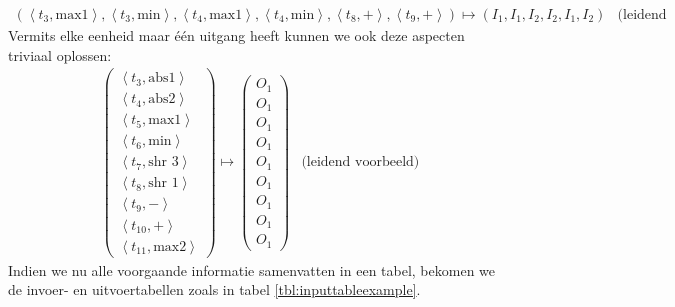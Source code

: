 \begin{equation}
\begin{array}{lr}
\left(\left\langle t_3,\mbox{max1}\right\rangle,\left\langle t_3,\mbox{min}\right\rangle,\left\langle t_4,\mbox{max1}\right\rangle,\left\langle t_4,\mbox{min}\right\rangle,\left\langle t_8,+\right\rangle,\left\langle t_9,+\right\rangle\right)\mapsto\left(I_1,I_1,I_2,I_2,I_1,I_2\right)&\mbox{(leidend voorbeeld)}
\end{array}
\end{equation}
Vermits elke eenheid maar \'e\'en uitgang heeft kunnen we ook deze aspecten triviaal oplossen:
\begin{equation}
\begin{array}{lr}
\left(\begin{array}{c}
\left\langle t_3,\mbox{abs1}\right\rangle\\
\left\langle t_4,\mbox{abs2}\right\rangle\\
\left\langle t_5,\mbox{max1}\right\rangle\\
\left\langle t_6,\mbox{min}\right\rangle\\
\left\langle t_7,\mbox{shr 3}\right\rangle\\
\left\langle t_8,\mbox{shr 1}\right\rangle\\
\left\langle t_9,-\right\rangle\\
\left\langle t_{10},+\right\rangle\\
\left\langle t_{11},\mbox{max2}\right\rangle
\end{array}\right)\mapsto\left(\begin{array}{c}
O_1\\O_1\\O_1\\O_1\\O_1\\O_1\\O_1\\O_1\\O_1
\end{array}\right)&\mbox{(leidend voorbeeld)}
\end{array}
\end{equation}
Indien we nu alle voorgaande informatie samenvatten in een tabel, bekomen we de invoer- en uitvoertabellen zoals in tabel \ref{tbl:inputtableexample}.
